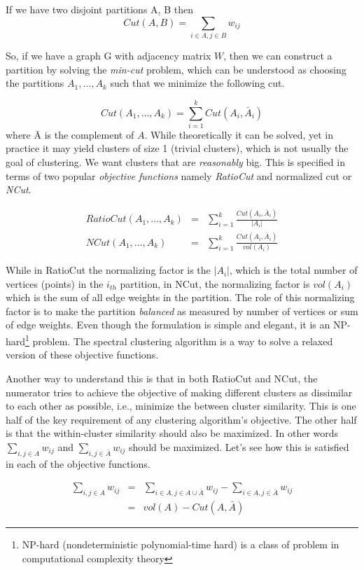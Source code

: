 If we have two disjoint partitions A, B then 
\[
	Cut(A,B) = \sum_{i \in A,j \in B}w_{ij}
\] 
	
So, if we have a graph G with adjacency matrix $W$, then we can construct a partition by solving the \textit{min-cut} problem, which can be understood as choosing the partitions $A_{1},\dots,A_{k}$ such that we minimize the following cut.

\[
	Cut(A_{1},\dots,A_{k}) = \sum_{i=1}^{k}Cut(A_{i},\bar{A}_{i})
\] 
where \={A} is the complement of $A$. While theoretically it can be solved, yet in practice it may yield clusters of size 1 (trivial clusters), which is not usually the goal of clustering. We want clusters that are \textit{reasonably} big. This is specified in terms of two popular \textit{objective functions} namely \textit{RatioCut} and normalized cut or \textit{NCut}.

\begin{eqnarray}
    RatioCut(A_{1},\dots,A_{k}) &=& \sum_{i=1}^{k}\frac{Cut(A_{i},\bar{A}_{i})}{|A_{i}|} \\
    NCut(A_{1},\dots,A_{k}) &=& \sum_{i=1}^{k}\frac{Cut(A_{i},\bar{A}_{i})}{vol(A_{i})}
\end{eqnarray}

While in RatioCut the normalizing factor is the $|A_{i}|$, which is the total number of vertices (points) in the $i_{th}$ partition, in NCut, the normalizing factor is $vol(A_{i})$ which is the sum of all edge weights in the partition. The role of this normalizing factor is to make the partition \textit{balanced} as measured by number of vertices or sum of edge weights. Even though the formulation is simple and elegant, it is an NP-hard\footnote{NP-hard (nondeterministic polynomial-time hard) is a class of problem in computational complexity theory} problem. The spectral clustering algorithm is a way to solve a relaxed version of these objective functions. 

Another way to understand this is that in both RatioCut and NCut, the numerator tries to achieve the objective of making different clusters as dissimilar to each other as possible, i.e., minimize the between cluster similarity. This is one half of the key requirement of any clustering algorithm's objective. The other half is that the within-cluster similarity should also be maximized. In other words $\sum_{i,j \in A}w_{ij}$ and $\sum_{i,j \in \bar{A}}w_{ij}$ should be maximized. Let's see how this is satisfied in each of the objective functions. 

\begin{eqnarray}
 \sum_{i,j \in A}w_{ij} &=& \sum_{i \in A, j \in A \cup \bar{A}}w_{ij} - \sum_{i \in A, j \in \bar{A}}w_{ij} \\
                        &=& vol(A) - Cut(A,\bar{A})	 
\end{eqnarray}

